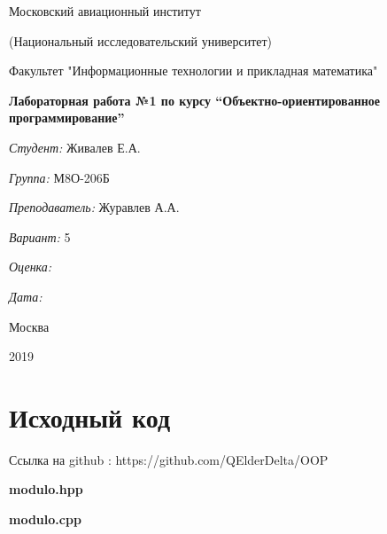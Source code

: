 \documentclass[a4paper, 12pt]{article}
\begin{document}
\thispagestyle{empty}	
\begin{center}
	Московский авиационный институт
	
	(Национальный исследовательский университет)
	
	Факультет "Информационные технологии и прикладная математика"
	
\end{center}
\vspace{40ex}
\begin{center}
	\textbf{\large{Лабораторная работа №1 по курсу \textquotedblleft Объектно-ориентированное программирование\textquotedblright}}
\end{center}
\vspace{40ex}
\begin{flushright}
	\textit{Студент: } Живалев Е.А.
	
	\vspace{2ex}
	\textit{Группа: } М8О-206Б
	
	\vspace{2ex}
	\textit{Преподаватель: } Журавлев А.А.
	
	\vspace{2ex}
	\textit{Вариант: } 5
	
	\vspace{2ex}
	\textit{Оценка: } \underline{\quad\quad\quad\quad\quad\quad}
	
	 \vspace{2ex}
	\textit{Дата: } \underline{\quad\quad\quad\quad\quad\quad}
	
\end{flushright}

\begin{vfill}
	\begin{center}
		Москва
		
		2019
	\end{center}	
\end{vfill}
\newpage
\section{Исходный код}

Ссылка на github : https://github.com/QElderDelta/OOP

\vspace{3ex}
\textbf{\large{modulo.hpp}}


\vspace{3ex}
\textbf{\large{modulo.cpp}}

\end{document}
